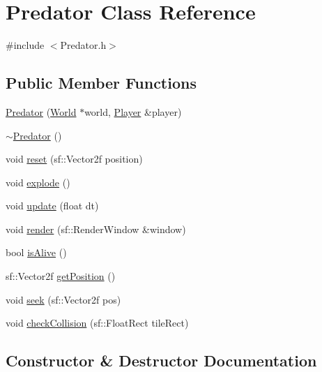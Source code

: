 \hypertarget{class_predator}{}\section{Predator Class Reference}
\label{class_predator}


{\ttfamily \#include $<$Predator.\+h$>$}

\subsection*{Public Member Functions}
\begin{DoxyCompactItemize}
\item 
\mbox{\hyperlink{class_predator_a0833aeac8e72233831677cc54b61c66f}{Predator}} (\mbox{\hyperlink{class_world}{World}} $\ast$world, \mbox{\hyperlink{class_player}{Player}} \&player)
\item 
\mbox{\hyperlink{class_predator_a9ef1a4a3a5988d1d1e5844a235b36b8b}{$\sim$\+Predator}} ()
\item 
void \mbox{\hyperlink{class_predator_a596b6e0c600560d7c3dc1bb0bf063f87}{reset}} (sf\+::\+Vector2f position)
\item 
void \mbox{\hyperlink{class_predator_a830de5346a893f15b76de907f798138a}{explode}} ()
\item 
void \mbox{\hyperlink{class_predator_a7070e47073a2a8f110b31d9cba00b35b}{update}} (float dt)
\item 
void \mbox{\hyperlink{class_predator_acf84bdda5a2ad7120ae182fbeac59516}{render}} (sf\+::\+Render\+Window \&window)
\item 
bool \mbox{\hyperlink{class_predator_a122ff47e06dce6c782a4ea66b85e5566}{is\+Alive}} ()
\item 
sf\+::\+Vector2f \mbox{\hyperlink{class_predator_aedebee8eb0a1f05ae209a44a014b3e97}{get\+Position}} ()
\item 
void \mbox{\hyperlink{class_predator_a7d1936de3c5d73264546002beecc4923}{seek}} (sf\+::\+Vector2f pos)
\item 
void \mbox{\hyperlink{class_predator_a4d2d48c955e92d23f95909e4e1f6a16f}{check\+Collision}} (sf\+::\+Float\+Rect tile\+Rect)
\end{DoxyCompactItemize}


\subsection{Constructor \& Destructor Documentation}
\mbox{\label{class_predator_a0833aeac8e72233831677cc54b61c66f}} 
